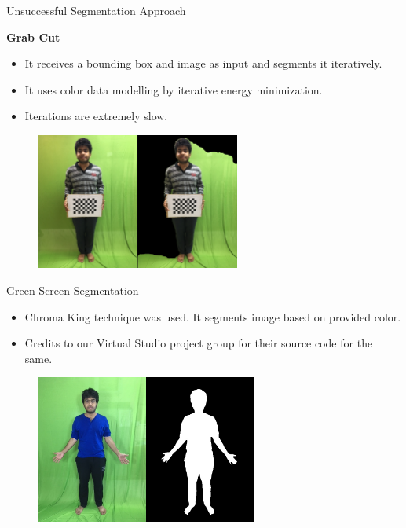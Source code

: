\documentclass{beamer}
\begin{document}
\begin{frame}[t]{Unsuccessful Segmentation Approach}

\textbf{Grab Cut}
\begin{itemize}
    \item It receives a bounding box and image as input and segments it iteratively. 
    \item It uses color data modelling by iterative energy minimization.
    \item Iterations are extremely slow.
\end{itemize}
\begin{figure}[h]
    \includegraphics[width=0.6\textwidth]{grub_cut_3.jpg}
\end{figure}
\end{frame}    

\begin{frame}[t]{Green Screen Segmentation}
\begin{itemize}
\item Chroma King technique was used. It segments image based on provided color. 
\item Credits to our Virtual Studio project group for their source code for the same.
\end{itemize}
\begin{figure}[h]
    \includegraphics[width=0.65\textwidth]{second.jpg}
\end{figure}
\end{frame}
\end{document}
